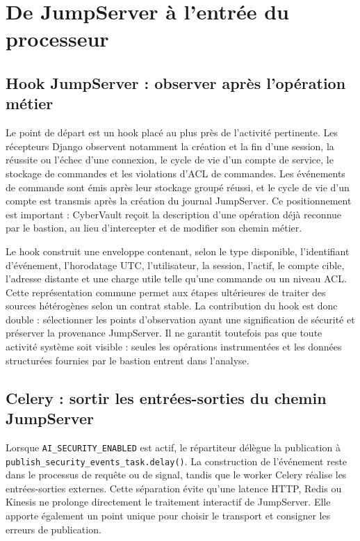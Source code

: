 \documentclass[11pt,a4paper,oneside]{report}
\theoremstyle{definition}
\theoremstyle{plain}
\begin{document}
\section{De JumpServer à l'entrée du processeur}

\subsection{Hook JumpServer : observer après l'opération métier}

Le point de départ est un hook placé au plus près de l'activité pertinente.
Les récepteurs Django observent notamment la création et la fin d'une session,
la réussite ou l'échec d'une connexion, le cycle de vie d'un compte de service,
le stockage de commandes et les violations d'ACL de commandes. Les événements
de commande sont émis après leur stockage groupé réussi, et le cycle de vie
d'un compte est transmis après la création du journal JumpServer. Ce
positionnement est important : CyberVault reçoit la description d'une
opération déjà reconnue par le bastion, au lieu d'intercepter et de modifier
son chemin métier.

Le hook construit une enveloppe contenant, selon le type disponible,
l'identifiant d'événement, l'horodatage UTC, l'utilisateur, la session,
l'actif, le compte cible, l'adresse distante et une charge utile telle qu'une
commande ou un niveau ACL. Cette représentation commune permet aux étapes
ultérieures de traiter des sources hétérogènes selon un contrat stable. La
contribution du hook est donc double : sélectionner les points d'observation
ayant une signification de sécurité et préserver la provenance JumpServer.
Il ne garantit toutefois pas que toute activité système soit visible : seules
les opérations instrumentées et les données structurées fournies par le
bastion entrent dans l'analyse.

\subsection{Celery : sortir les entrées-sorties du chemin JumpServer}

Lorsque \texttt{AI\_SECURITY\_ENABLED} est actif, le répartiteur délègue la
publication à \texttt{publish\_security\_events\_task.delay()}. La construction
de l'événement reste dans le processus de requête ou de signal, tandis que le
worker Celery réalise les entrées-sorties externes. Cette séparation évite
qu'une latence HTTP, Redis ou Kinesis ne prolonge directement le traitement
interactif de JumpServer. Elle apporte également un point unique pour choisir
le transport et consigner les erreurs de publication.
\end{document}
